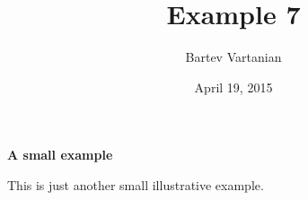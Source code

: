 \documentclass{article}
\begin{document}
\title{Example 7}
\author{Bartev Vartanian}
\date{April 19, 2015}

\maketitle

\begin{huge}
\bfseries
A small example

\end{huge}

\bigskip
This is just another small illustrative example.
\end{document}
